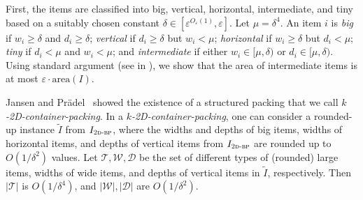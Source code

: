 \documentclass[a4paper,UKenglish,cleveref, autoref, thm-restate]{lipics-v2021}
\newcommand{\eps}{\varepsilon}
\newcommand{\twobp}{\textsc{2d-bp}\xspace}
\newcommand{\inter}{intermediate\xspace}
\newcommand{\bigy}{big\xspace}
\newcommand{\tin}{tiny\xspace}
\newcommand{\area}{\mathrm{area}}
\begin{document}
First, the items are classified into \bigy, vertical, horizontal, \inter, and  \tin based on a suitably chosen constant $\delta \in [\eps^{O_{\eps}(1)}, \eps]$.
Let $\mu = \delta^4$.
An item $i$ is {\em \bigy} if $w_i \geq \delta$ and $d_i \geq \delta$; {\em vertical} if $d_i \geq \delta$ but $w_i < \mu$; {\em horizontal} if $w_i \geq \delta$ but $d_i < \mu$; {\em \tin} if $d_i < \mu$ and $w_i < \mu$; and {\em \inter} if either $w_i \in [\mu,\delta)$ or $d_i \in [\mu,\delta)$.
Using standard argument (see  in ), we show that the area of \inter items is at most $\eps \cdot \area(I)$. 



Jansen and Prädel~\cite{jansen2016new} showed the existence of a structured packing that we call \emph{$k$-2D-container-packing}.
In a \emph{$k$-2D-container-packing}, one can consider a rounded-up instance $\tilde{I}$ from $I_{\twobp}$, where the widths and depths of \bigy items, widths of horizontal items, and depths of vertical items from $I_{\twobp}$ are rounded up to $O(1/\delta^2)$ values.
Let $\mathcal{T}, \mathcal{W}, \mathcal{D}$ be the set of different types of (rounded) large items, widths of wide items, and depths of vertical items in $\tilde{I}$, respectively. 
Then $|\mathcal{T}|$ is $O(1/\delta^4)$, and $|\mathcal{W}|, |\mathcal{D}|$ are $O(1/\delta^2)$. 
\end{document}
